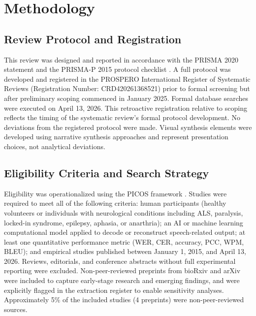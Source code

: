 \documentclass[11pt,a4paper]{article}
\begin{document}
\section{Methodology}
\label{sec:methodology}

\subsection{Review Protocol and Registration}

This review was designed and reported in accordance with the PRISMA 2020 statement \cite{Page2021} and the PRISMA-P 2015 protocol checklist \cite{Shamseer2015,Tricco2018}. A full protocol was developed and registered in the PROSPERO International Register of Systematic Reviews (Registration Number: CRD420261368521) prior to formal screening but after preliminary scoping commenced in January 2025. Formal database searches were executed on April 13, 2026. This retroactive registration relative to scoping reflects the timing of the systematic review's formal protocol development. No deviations from the registered protocol were made. Visual synthesis elements were developed using narrative synthesis approaches \cite{Popay2006} and represent presentation choices, not analytical deviations.

\subsection{Eligibility Criteria and Search Strategy}

Eligibility was operationalized using the PICOS framework \cite{Richardson1995}. Studies were required to meet all of the following criteria: human participants (healthy volunteers or individuals with neurological conditions including ALS, paralysis, locked-in syndrome, epilepsy, aphasia, or anarthria); an AI or machine learning computational model applied to decode or reconstruct speech-related output; at least one quantitative performance metric (WER, CER, accuracy, PCC, WPM, BLEU); and empirical studies published between January 1, 2015, and April 13, 2026. Reviews, editorials, and conference abstracts without full experimental reporting were excluded. Non-peer-reviewed preprints from bioRxiv and arXiv were included to capture early-stage research and emerging findings, and were explicitly flagged in the extraction register to enable sensitivity analyses. Approximately 5\% of the included studies (4 preprints) were non-peer-reviewed sources.
\end{document}
